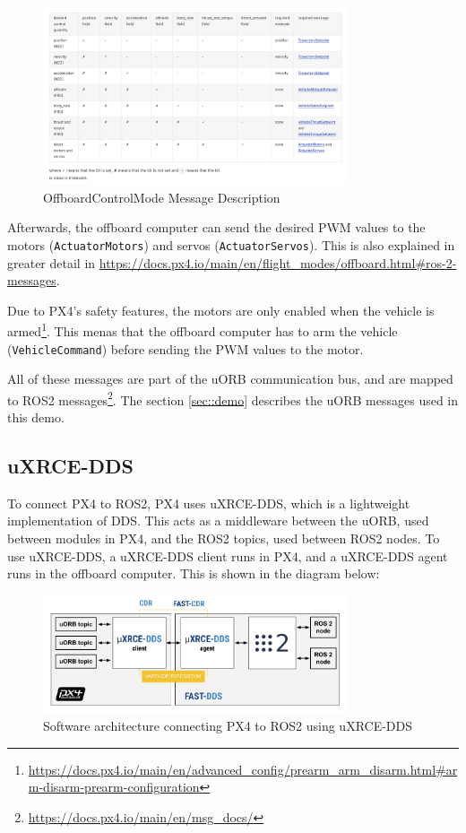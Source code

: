 \documentclass[a4paper]{article}
\begin{document}
\begin{figure}[H]
    \centering
    \includegraphics[width=0.8\textwidth]{imgs/OffboardControlMode authority table.png}
    \caption{OffboardControlMode Message Description}
    \label{fig:offboard_control_mode}
\end{figure}

Afterwards, the offboard computer can send the desired PWM values to the motors (\verb|ActuatorMotors|) and servos (\verb|ActuatorServos|). 
This is also explained in greater detail in \url{https://docs.px4.io/main/en/flight_modes/offboard.html#ros-2-messages}. 

Due to PX4's safety features, the motors are only enabled when the vehicle is armed\footnote{\url{https://docs.px4.io/main/en/advanced_config/prearm_arm_disarm.html\#arm-disarm-prearm-configuration}}. 
This menas that the offboard computer has to arm the vehicle (\verb|VehicleCommand|) before sending the PWM values to the motor. 

All of these messages are part of the uORB communication bus, and are mapped to ROS2 messages\footnote{\url{https://docs.px4.io/main/en/msg_docs/}}. 
The section \ref{sec::demo} describes the uORB messages used in this demo.

\subsection{uXRCE-DDS}

To connect PX4 to ROS2, PX4 uses uXRCE-DDS, which is a lightweight implementation of DDS. 
This acts as a middleware between the uORB, used between modules in PX4, and the ROS2 topics, used between ROS2 nodes. 
To use uXRCE-DDS, a uXRCE-DDS client runs in PX4, and a uXRCE-DDS agent runs in the offboard computer. 
This is shown in the diagram below: 

\begin{figure}[H]
    \centering
    \includegraphics[width=0.8\textwidth]{imgs/architecture_xrce_dds_ros2.png}
    \caption{Software architecture connecting PX4 to ROS2 using uXRCE-DDS}
    \label{fig:architecture_xrce_dds_ros2}
\end{figure}
\end{document}
